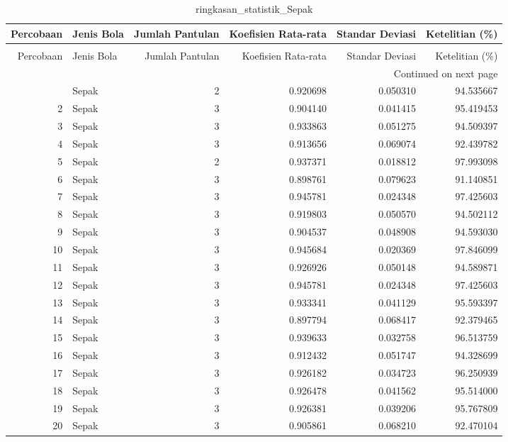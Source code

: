 \begin{longtable}{rlrrrr}
\caption{ringkasan_statistik_Sepak} \label{tab:ringkasan_Sepak} \\
\toprule
Percobaan & Jenis Bola & Jumlah Pantulan & Koefisien Rata-rata & Standar Deviasi & Ketelitian (\%) \\
\midrule
\endfirsthead
\caption[]{ringkasan_statistik_Sepak} \\
\toprule
Percobaan & Jenis Bola & Jumlah Pantulan & Koefisien Rata-rata & Standar Deviasi & Ketelitian (\%) \\
\midrule
\endhead
\midrule
\multicolumn{6}{r}{Continued on next page} \\
\midrule
\endfoot
\bottomrule
\endlastfoot
1 & Sepak & 2 & 0.920698 & 0.050310 & 94.535667 \\
2 & Sepak & 3 & 0.904140 & 0.041415 & 95.419453 \\
3 & Sepak & 3 & 0.933863 & 0.051275 & 94.509397 \\
4 & Sepak & 3 & 0.913656 & 0.069074 & 92.439782 \\
5 & Sepak & 2 & 0.937371 & 0.018812 & 97.993098 \\
6 & Sepak & 3 & 0.898761 & 0.079623 & 91.140851 \\
7 & Sepak & 3 & 0.945781 & 0.024348 & 97.425603 \\
8 & Sepak & 3 & 0.919803 & 0.050570 & 94.502112 \\
9 & Sepak & 3 & 0.904537 & 0.048908 & 94.593030 \\
10 & Sepak & 3 & 0.945684 & 0.020369 & 97.846099 \\
11 & Sepak & 3 & 0.926926 & 0.050148 & 94.589871 \\
12 & Sepak & 3 & 0.945781 & 0.024348 & 97.425603 \\
13 & Sepak & 3 & 0.933341 & 0.041129 & 95.593397 \\
14 & Sepak & 3 & 0.897794 & 0.068417 & 92.379465 \\
15 & Sepak & 3 & 0.939633 & 0.032758 & 96.513759 \\
16 & Sepak & 3 & 0.912432 & 0.051747 & 94.328699 \\
17 & Sepak & 3 & 0.926182 & 0.034723 & 96.250939 \\
18 & Sepak & 3 & 0.926478 & 0.041562 & 95.514000 \\
19 & Sepak & 3 & 0.926381 & 0.039206 & 95.767809 \\
20 & Sepak & 3 & 0.905861 & 0.068210 & 92.470104 \\
\end{longtable}

